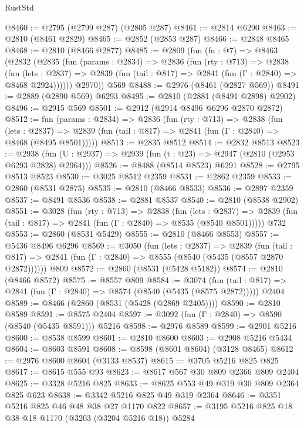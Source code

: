 \begin{lexlean}{RustStd}
\begin{coremodule}
@8460 := @2795 (@2799 @287) (@2805 @287)
@8461 := @2814 @6290
@8463 := @2810 (@8461 @2829)
@8465 := @2852 (@2853 @287)
@8466 := @2848 @8465
@8468 := @2810 (@8466 @2877)
@8485 := @2809
    (fun (fn : @7) =>
    @8463
      (@2832
        (@2835
          (fun (params : @2834) =>
          @2836
            (fun (rty : @713) =>
            @2838
              (fun (lets : @2837) =>
              @2839 (fun (tail : @817) => @2841 (fun (Γ : @2840) => @8468 @2924))))))
        @2970))
    @569
@8488 := @2976 (@8461 (@2827 @569))
@8491 := @2889 (@2890 @569) @6293
@8495 := @2810 (@2881 (@8491 @2898) @2902)
@8496 := @2915 @569
@8501 := @2912 (@2914 @8496 @6296 @2870 @2872)
@8512 := fun (params : @2834) =>
  @2836
    (fun (rty : @713) =>
    @2838
      (fun (lets : @2837) =>
      @2839 (fun (tail : @817) => @2841 (fun (Γ : @2840) => @8468 (@8495 @8501)))))
@8513 := @2835 @8512
@8514 := @2832 @8513
@8523 := @2938 (fun (U : @2937) => @2939 (fun (t : @23) => @2947 (@2810 (@2953 @6293 @2828) @2964)))
@8526 := @8488 (@8514 @8523) @6291
@8528 := @2795 @8513 @8523
@8530 := @3025 @8512 @2359
@8531 := @2862 @2359
@8533 := @2860 (@8531 @2875)
@8535 := @2810 (@8466 @8533)
@8536 := @2897 @2359
@8537 := @8491 @8536
@8538 := @2881 @8537
@8540 := @2810 (@8538 @2902)
@8551 := @3028
    (fun (rty : @713) =>
    @2838
      (fun (lets : @2837) =>
      @2839 (fun (tail : @817) => @2841 (fun (Γ : @2840) => @8535 (@8540 @8501)))))
    @732
@8553 := @2860 (@8531 @5429)
@8555 := @2810 (@8466 @8553)
@8557 := @5436 @8496 @6296
@8569 := @3050
    (fun (lets : @2837) =>
    @2839
      (fun (tail : @817) => @2841 (fun (Γ : @2840) => @8555 (@8540 (@5435 (@8557 @2870 @2872))))))
    @809
@8572 := @2860 (@8531 (@5428 @5182))
@8574 := @2810 (@8466 @8572)
@8575 := @8557 @809
@8584 := @3074
    (fun (tail : @817) => @2841 (fun (Γ : @2840) => @8574 (@8540 (@5435 (@8575 @2872)))))
    @2404
@8589 := @8466 (@2860 (@8531 (@5428 (@2869 @2405))))
@8590 := @2810 @8589
@8591 := @8575 @2404
@8597 := @3092 (fun (Γ : @2840) => @8590 (@8540 (@5435 @8591))) @5216
@8598 := @2976 @8589
@8599 := @2901 @5216
@8600 := @8538 @8599
@8601 := @2810 @8600
@8603 := @2908 @5216 @5434
@8604 := @8603 @8591
@8608 := @8598 (@8601 @8604) (@3128 @8465)
@8612 := @2976 @8600 @8604 (@3133 @8537)
@8615 := @3705 @5216 @825 @825
@8617 := @8615 @555 @93
@8623 := @8617 @567 @30 @809 @2366 @809 @2404
@8625 := @3328 @5216 @825
@8633 := @8625 @553 @49 @319 @30 @809 @2364 @825 @623
@8638 := @3342 @5216 @825 @49 @319 @2364
@8646 := @3351 @5216 @825 @46 @48 @38 @27 @1170 @822
@8657 := @3195 @5216 @825 @18 @38 @18 @1170 (@3203 (@3204 @5216 @18)) @5284

\end{coremodule}
\end{lexlean}
